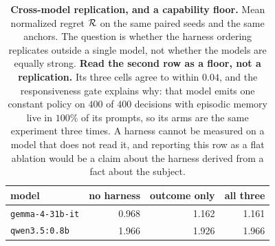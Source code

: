 \begin{table}[t]\centering\small
\caption{\textbf{Cross-model replication, and a capability floor.} Mean normalized regret
$\mathcal{R}$ on the same paired seeds and the same anchors. The question is whether the harness ordering
replicates outside a single model, not whether the models are equally strong. \textbf{Read the
second row as a floor, not a replication.} Its three cells agree to within $0.04$, and the
responsiveness gate explains why: that model emits one constant policy on $400$ of $400$ decisions
with episodic memory live in $100\%$ of its prompts, so its arms are the same experiment three times.
A harness cannot be measured on a model that does not read it, and reporting this row as a flat
ablation would be a claim about the harness derived from a fact about the subject.}
\label{tab:crossmodel}
\begin{tabular}{@{}l r r r@{}}
\toprule
model & no harness & outcome only & all three \\
\midrule
\texttt{gemma-4-31b-it} & 0.968 & 1.162 & 1.161 \\
\texttt{qwen3.5:0.8b} & 1.966 & 1.926 & 1.966 \\
\bottomrule
\end{tabular}
\end{table}
